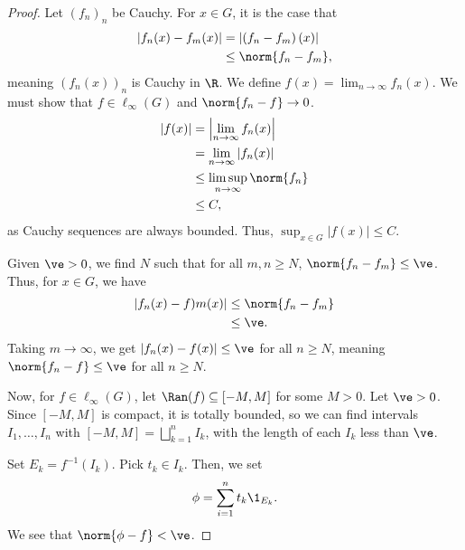 \documentclass[10pt]{mypackage}
\begin{document}
\begin{proof}
  Let $\left(f_n\right)_n$ be Cauchy. For $x\in G$, it is the case that
  \begin{align*}
    \left\vert f_n(x) - f_m(x) \right\vert &= \left\vert \left(f_n - f_m\right)(x) \right\vert\\
                                           &\leq \norm{f_n - f_m},
  \end{align*}
  meaning $\left(f_n(x)\right)_n$ is Cauchy in $\R$. We define $f(x) = \lim_{n\rightarrow\infty}f_n(x)$. We must show that $f\in \ell_{\infty}(G)$ and $\norm{f_n - f} \rightarrow 0$.
  \begin{align*}
    \left\vert f(x) \right\vert &= \left\vert \lim_{n\rightarrow\infty} f_n(x) \right\vert\\
                                &= \lim_{n\rightarrow\infty} \left\vert f_n(x) \right\vert\\
                                &\leq \limsup_{n\rightarrow\infty}\norm{f_n}\\
                                &\leq C,
  \end{align*}
  as Cauchy sequences are always bounded. Thus, $\sup_{x\in G}\left\vert f(x) \right\vert \leq C$.\newline

  Given $\ve > 0$, we find $N$ such that for all $m,n\geq N$, $\norm{f_n - f_m} \leq \ve$. Thus, for $x\in G$, we have
  \begin{align*}
    \left\vert f_n(x) - f)m(x) \right\vert &\leq \norm{f_n - f_m}\\
                                           &\leq \ve.
  \end{align*}
  Taking $m\rightarrow\infty$, we get $\left\vert f_n(x) - f(x) \right\vert \leq \ve$ for all $n\geq N$, meaning $\norm{f_n - f} \leq \ve$ for all $n\geq N$.\newline

  Now, for $f\in \ell_{\infty}(G)$, let $\Ran(f) \subseteq \left[-M,M\right]$ for some $M > 0$. Let $\ve > 0$. Since $\left[-M,M\right]$ is compact, it is totally bounded, so we can find intervals $I_1,\dots,I_n$ with $\left[-M,M\right] = \bigsqcup_{k=1}^{n}I_k$, with the length of each $I_k$ less than $\ve$.\newline

  Set $E_k = f^{-1}\left(I_k\right)$. Pick $t_k\in I_k$. Then, we set
  \begin{align*}
    \phi = \sum_{i=1}^{n}t_k \1_{E_k}.
  \end{align*}
  We see that $\norm{\phi - f} < \ve$.
\end{proof}
\end{document}
